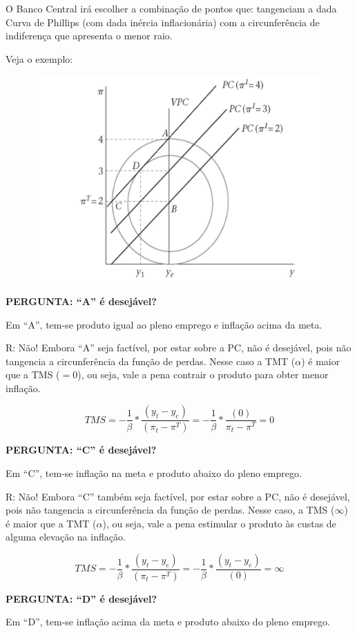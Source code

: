 \documentclass[a4paper,12pt]{article}[abntex2]
\begin{document}
O Banco Central irá escolher a combinação de pontos que: tangenciam a dada Curva de Phillips (com dada inércia inflacionária) com a circunferência de indiferença que apresenta o menor raio.

Veja o exemplo:

\begin{figure}[H]
    \centering
    \includegraphics[width=0.7\linewidth]{Imagens/a15i5.png}
\end{figure}

\textbf{PERGUNTA: “A” é desejável?}

Em “A”, tem-se produto igual ao pleno emprego e inflação acima da meta.

R: Não! Embora “A” seja factível, por estar sobre a PC, não é desejável, pois não tangencia a circunferência da função de perdas. Nesse caso a TMT (\(\alpha\)) é maior que a TMS (\(= 0\)), ou seja, vale a pena contrair o produto para obter menor inflação.

\[
TMS = - \frac{1}{\beta} * \frac{(y_t - y_e)}{(\pi_t - \pi^T)} = - \frac{1}{\beta} * \frac{(0)}{\pi_t - \pi^T} = 0
\]

\textbf{PERGUNTA: “C” é desejável?}

Em “C”, tem-se inflação na meta e produto abaixo do pleno emprego.

R: Não! Embora “C” também seja factível, por estar sobre a PC, não é desejável, pois não tangencia a circunferência da função de perdas. Nesse caso, a TMS (\(\infty\)) é maior que a TMT (\(\alpha\)), ou seja, vale a pena estimular o produto às custas de alguma elevação na inflação.

\[
TMS = - \frac{1}{\beta} * \frac{(y_t - y_e)}{(\pi_t - \pi^T)} = - \frac{1}{\beta} * \frac{(y_t - y_e)}{(0)} = \infty
\]

\textbf{PERGUNTA: “D” é desejável?}

Em “D”, tem-se inflação acima da meta e produto abaixo do pleno emprego.
\end{document}
